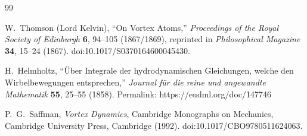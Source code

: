 \begin{thebibliography}{99}

W.~Thomson (Lord Kelvin),
``On Vortex Atoms,''
\emph{Proceedings of the Royal Society of Edinburgh} \textbf{6}, 94--105 (1867/1869),
reprinted in \emph{Philosophical Magazine} \textbf{34}, 15--24 (1867).
\newblock doi:10.1017/S0370164600045430.

H.~Helmholtz,
``\"Uber Integrale der hydrodynamischen Gleichungen, welche den Wirbelbewegungen entsprechen,''
\emph{Journal f\"ur die reine und angewandte Mathematik} \textbf{55}, 25--55 (1858).
\newblock Permalink: https://eudml.org/doc/147746

P.~G.~Saffman,
\emph{Vortex Dynamics},
Cambridge Monographs on Mechanics,
Cambridge University Press, Cambridge (1992).
\newblock doi:10.1017/CBO9780511624063.

\end{thebibliography}
